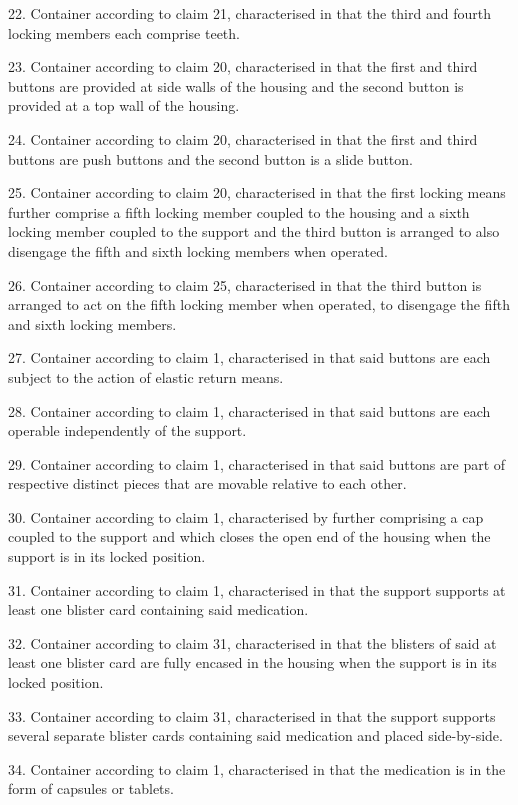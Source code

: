 \documentclass[11pt,a4paper]{article}
\begin{document}
22. Container according to claim 21, characterised in that the third and fourth locking members each comprise teeth.

23. Container according to claim 20, characterised in that the first and third buttons are provided at side walls of the housing and the second button is provided at a top wall of the housing.

24. Container according to claim 20, characterised in that the first and third buttons are push buttons and the second button is a slide button.

25. Container according to claim 20, characterised in that the first locking means further comprise a fifth locking member coupled to the housing and a sixth locking member coupled to the support and the third button is arranged to also disengage the fifth and sixth locking members when operated.

26. Container according to claim 25, characterised in that the third button is arranged to act on the fifth locking member when operated, to disengage the fifth and sixth locking members.

27. Container according to claim 1, characterised in that said buttons are each subject to the action of elastic return means.

28. Container according to claim 1, characterised in that said buttons are each operable independently of the support.

29. Container according to claim 1, characterised in that said buttons are part of respective distinct pieces that are movable relative to each other.

30. Container according to claim 1, characterised by further comprising a cap coupled to the support and which closes the open end of the housing when the support is in its locked position.

31. Container according to claim 1, characterised in that the support supports at least one blister card containing said medication.

32. Container according to claim 31, characterised in that the blisters of said at least one blister card are fully encased in the housing when the support is in its locked position.

33. Container according to claim 31, characterised in that the support supports several separate blister cards containing said medication and placed side-by-side.

34. Container according to claim 1, characterised in that the medication is in the form of capsules or tablets.
\end{document}
